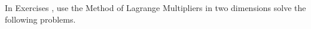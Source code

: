 {\noindent In Exercises} 
{,  use the Method of Lagrange Multipliers in two dimensions solve the following problems.
}
